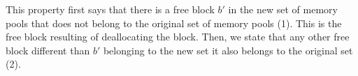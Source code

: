 This property first says that there is a free block $b'$ in the new set of memory pools that does not belong to the original set of memory pools (1). This is the free block resulting of deallocating the block. Then, we state that any other free block different than $b'$ belonging to the new set it also belongs to the original set (2).

%

%
%
%

